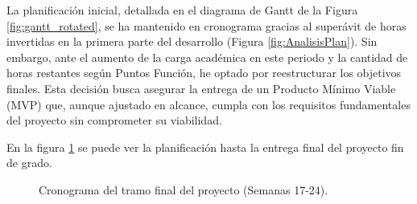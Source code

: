 La planificación inicial, detallada en el diagrama de Gantt de la Figura \ref{fig:gantt_rotated}, se ha mantenido en cronograma gracias al superávit de horas invertidas en la primera parte del desarrollo (Figura \ref{fig:AnalisisPlan}). Sin embargo, ante el aumento de la carga académica en este periodo y la cantidad de horas restantes según Puntos Función, he optado por reestructurar los objetivos finales. Esta decisión busca asegurar la entrega de un Producto Mínimo Viable (MVP) que, aunque ajustado en alcance, cumpla con los requisitos fundamentales del proyecto sin comprometer su viabilidad. 

En la figura \ref{fig:gantt_final_v2} se puede ver la planificación hasta la entrega final del proyecto fin de grado.


\begin{figure}[p]
    \centering
    

    \vspace{0.8cm} 
    \caption{Cronograma del tramo final del proyecto (Semanas 17-24).}
    \label{fig:gantt_final_v2}
\end{figure}
